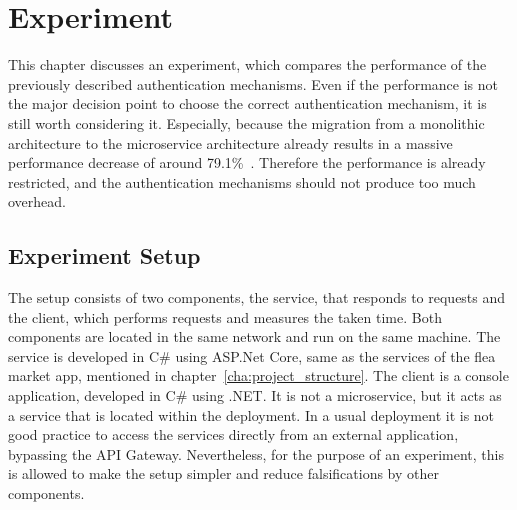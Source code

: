 \chapter{Experiment}
\label{cha:experiment}
This chapter discusses an experiment, which compares the performance of the previously described authentication mechanisms.
Even if the performance is not the major decision point to choose the correct authentication mechanism, it is still worth considering it.
Especially, because the migration from a monolithic architecture to the microservice architecture already results in a massive performance decrease of around 79.1\%~\cite{ueda2016workload}.
Therefore the performance is already restricted, and the authentication mechanisms should not produce too much overhead.

\section{Experiment Setup}
The setup consists of two components, the service, that responds to requests and the client, which performs requests and measures the taken time.
Both components are located in the same network and run on the same machine.
The service is developed in C\# using ASP.Net Core, same as the services of the flea market app, mentioned in chapter~\ref{cha:project_structure}.
The client is a console application, developed in C\# using .NET.
It is not a microservice, but it acts as a service that is located within the deployment.
In a usual deployment it is not good practice to access the services directly from an external application, bypassing the API Gateway.
Nevertheless, for the purpose of an experiment, this is allowed to make the setup simpler and reduce falsifications by other components. 


